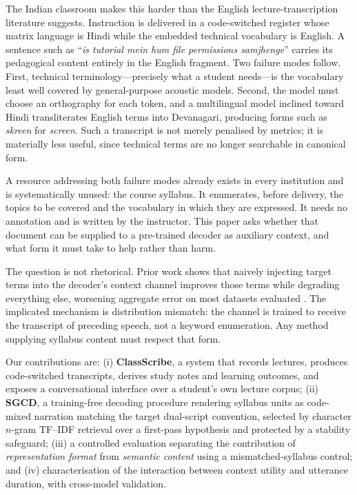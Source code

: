 \documentclass[conference]{IEEEtran}
\begin{document}
The Indian classroom makes this harder than the English lecture-transcription
literature suggests. Instruction is delivered in a code-switched register whose
matrix language is Hindi while the embedded technical vocabulary is English. A
sentence such as ``\textit{is tutorial mein hum file permissions samjhenge}''
carries its pedagogical content entirely in the English fragment. Two failure
modes follow. First, technical terminology---precisely what a student needs---is
the vocabulary least well covered by general-purpose acoustic models. Second, the
model must choose an orthography for each token, and a multilingual model
inclined toward Hindi transliterates English terms into Devanagari, producing
forms such as \textit{skreen} for \textit{screen}. Such a transcript is not
merely penalised by metrics; it is materially less useful, since technical terms
are no longer searchable in canonical form.

A resource addressing both failure modes already exists in every institution and
is systematically unused: the course syllabus. It enumerates, before delivery,
the topics to be covered and the vocabulary in which they are expressed. It needs
no annotation and is written by the instructor. This paper asks whether that
document can be supplied to a pre-trained decoder as auxiliary context, and what
form it must take to help rather than harm.

The question is not rhetorical. Prior work shows that naively injecting target
terms into the decoder's context channel improves those terms while degrading
everything else, worsening aggregate error on most datasets evaluated
\cite{sun2023contextual}. The implicated mechanism is distribution mismatch: the
channel is trained to receive the transcript of preceding speech, not a keyword
enumeration. Any method supplying syllabus content must respect that form.

Our contributions are: (i) \textbf{ClassScribe}, a system that records lectures,
produces code-switched transcripts, derives study notes and learning outcomes,
and exposes a conversational interface over a student's own lecture corpus;
(ii) \textbf{SGCD}, a training-free decoding procedure rendering syllabus units as
code-mixed narration matching the target dual-script convention, selected by
character $n$-gram TF--IDF retrieval over a first-pass hypothesis and protected by
a stability safeguard; (iii) a controlled evaluation separating the contribution
of \textit{representation format} from \textit{semantic content} using a
mismatched-syllabus control; and (iv) characterisation of the interaction between
context utility and utterance duration, with cross-model validation.
\end{document}
